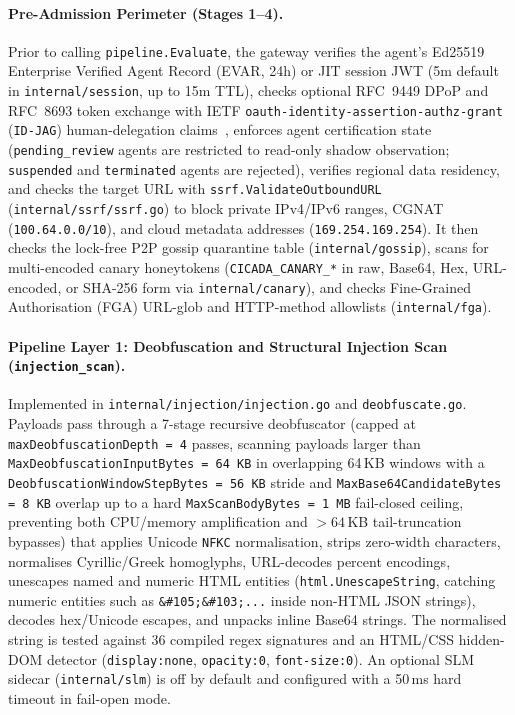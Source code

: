 \documentclass[11pt, a4paper]{article}
\begin{document}
\paragraph{Pre-Admission Perimeter (Stages 1--4).}
Prior to calling \texttt{pipeline.Evaluate}, the gateway verifies the agent's Ed25519 Enterprise Verified Agent Record (EVAR, 24h) or JIT session JWT (5m default in \texttt{internal/session}, up to 15m TTL), checks optional RFC~9449 DPoP and RFC~8693 token exchange with IETF \texttt{oauth-identity-assertion-authz-grant} (\texttt{ID-JAG}) human-delegation claims~\cite{ciba}, enforces agent certification state (\texttt{pending\_review} agents are restricted to read-only shadow observation; \texttt{suspended} and \texttt{terminated} agents are rejected), verifies regional data residency, and checks the target URL with \texttt{ssrf.ValidateOutboundURL} (\texttt{internal/ssrf/ssrf.go}) to block private IPv4/IPv6 ranges, CGNAT (\texttt{100.64.0.0/10}), and cloud metadata addresses (\texttt{169.254.169.254}). It then checks the lock-free P2P gossip quarantine table (\texttt{internal/gossip}), scans for multi-encoded canary honeytokens (\texttt{CICADA\_CANARY\_*} in raw, Base64, Hex, URL-encoded, or SHA-256 form via \texttt{internal/canary}), and checks Fine-Grained Authorisation (FGA) URL-glob and HTTP-method allowlists (\texttt{internal/fga}).

\paragraph{Pipeline Layer 1: Deobfuscation and Structural Injection Scan (\texttt{injection\_scan}).}
Implemented in \texttt{internal/injection/injection.go} and \texttt{deobfuscate.go}. Payloads pass through a 7-stage recursive deobfuscator (capped at \texttt{maxDeobfuscationDepth = 4} passes, scanning payloads larger than \texttt{MaxDeobfuscationInputBytes = 64\,KB} in overlapping 64\,KB windows with a \texttt{DeobfuscationWindowStepBytes = 56\,KB} stride and \texttt{MaxBase64CandidateBytes = 8\,KB} overlap up to a hard \texttt{MaxScanBodyBytes = 1\,MB} fail-closed ceiling, preventing both CPU/memory amplification and $>64\,$KB tail-truncation bypasses) that applies Unicode \texttt{NFKC} normalisation, strips zero-width characters, normalises Cyrillic/Greek homoglyphs, URL-decodes percent encodings, unescapes named and numeric HTML entities (\texttt{html.UnescapeString}, catching numeric entities such as \texttt{\&\#105;\&\#103;...} inside non-HTML JSON strings), decodes hex/Unicode escapes, and unpacks inline Base64 strings. The normalised string is tested against 36 compiled regex signatures and an HTML/CSS hidden-DOM detector (\texttt{display:none}, \texttt{opacity:0}, \texttt{font-size:0}). An optional SLM sidecar (\texttt{internal/slm}) is off by default and configured with a 50\,ms hard timeout in fail-open mode.
\end{document}
